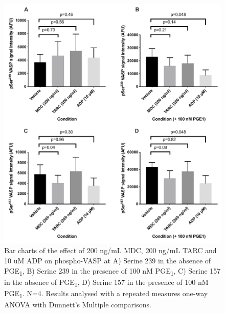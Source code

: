 \documentclass[11pt,twoside]{bristolthesis}
\begin{document}
\begin{figure}
\includegraphics{figure/Chemokines/Layouts/MDC_TARC_WB_VASP} \caption[Quantification of the effect of MDC, TARC and ADP on PGE\textsubscript{1} stimulated phospho-VASP.]{Bar charts of the effect of 200 ng/mL MDC, 200 ng/mL TARC and 10 uM ADP on phospho-VASP at A) Serine 239 in the absence of PGE\textsubscript{1}, B) Serine 239 in the presence of 100 nM PGE\textsubscript{1}, C) Serine 157 in the absence of PGE\textsubscript{1}, D) Serine 157 in the presence of 100 nM PGE\textsubscript{1}. N=4. Results analysed with a repeated measures one-way ANOVA with Dunnett's Multiple comparisons.}\label{fig:MDC-TARC-wp-VASP-bar}
\end{figure}
\end{document}
